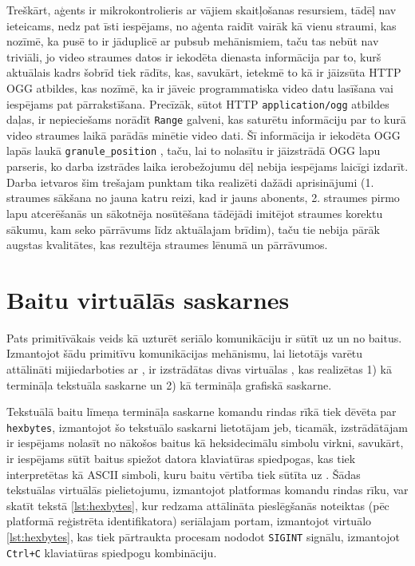 Treškārt, aģents ir mikrokontrolieris ar vājiem skaitļošanas resursiem, tādēļ
nav ieteicams, nedz pat īsti iespējams, no aģenta raidīt vairāk kā vienu
straumi, kas nozīmē, ka  pusē to ir jāduplicē ar
\gls{pubsub} mehānismiem, taču tas nebūt nav triviāli, jo video straumes datos
ir iekodēta dienasta informācija par to, kurš aktuālais kadrs šobrīd tiek
rādīts, kas, savukārt, ietekmē to kā  ir jāizsūta HTTP
OGG atbildes, kas nozīmē, ka ir jāveic programmatiska video datu lasīšana vai
iespējams pat pārrakstīšana. Precīzāk, sūtot HTTP \lstinline!application/ogg!
atbildes daļas, ir nepieciešams norādīt \lstinline!Range! galveni, kas saturētu
informāciju par to kurā video straumes laikā parādās minētie video dati.
\cite[para. 14.35.2]{RFC2616} Šī informācija ir iekodēta OGG lapās laukā
\lstinline!granule_position! \cite[para 6., A]{RFC3533}, taču, lai to nolasītu
ir jāizstrādā OGG lapu parseris, ko darba izstrādes laika ierobežojumu dēļ
nebija iespējams laicīgi izdarīt. Darba ietvaros šim trešajam punktam tika
realizēti dažādi aprisinājumi (1. straumes sākšana no jauna katru reizi, kad ir
jauns abonents, 2. straumes pirmo lapu atcerēšanās un sākotnēja nosūtēšana
tādējādi imitējot straumes korektu sākumu, kam seko pārrāvums līdz aktuālajam
brīdim), taču tie nebija pārāk augstas kvalitātes, kas rezultēja straumes lēnumā
un pārrāvumos. 

\section{Baitu virtuālās saskarnes}
\label{sec:vinbytes}

Pats primitīvākais veids kā uzturēt seriālo komunikāciju ir sūtīt uz un no
 baitus. Izmantojot šādu primitīvu komunikācijas
mehānismu, lai lietotājs varētu attālināti mijiedarboties ar
, ir izstrādātas divas virtuālas
, kas realizētas 1) kā termināļa tekstuāla
saskarne un 2) kā termināļa grafiskā saskarne.

Tekstuālā baitu līmeņa termināļa saskarne komandu rindas rīkā tiek dēvēta par
\lstinline!hexbytes!, izmantojot šo tekstuālo saskarni
 lietotājam jeb, ticamāk, izstrādātājam ir iespējams
nolasīt no  nākošos baitus kā heksidecimālu simbolu
virkni, savukārt,  ir iespējams sūtīt baitus spiežot
datora klaviatūras spiedpogas, kas tiek interpretētas kā ASCII simboli, kuru
baitu vērtība tiek sūtīta uz . Šādas tekstuālas
virtuālās  pielietojumu, izmantojot platformas
komandu rindas rīku, var skatīt tekstā \ref{lst:hexbytes}, kur redzama
attālināta pieslēgšanās noteiktas  (pēc platformā
reģistrēta identifikatora) seriālajam portam, izmantojot virtuālo
 \ref{lst:hexbytes}, kas tiek pārtraukta procesam
nododot \lstinline!SIGINT! signālu, izmantojot \lstinline!Ctrl+C! klaviatūras
spiedpogu kombināciju.

